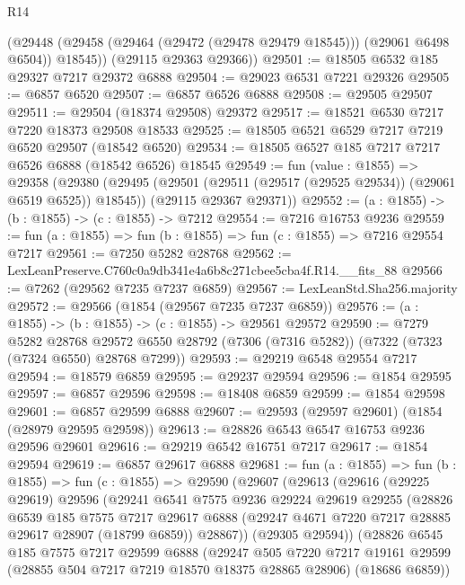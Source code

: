 \begin{lexlean}{R14}
\begin{coremodule}
        (@29448 (@29458 (@29464 (@29472 (@29478 @29479 @18545))) (@29061 @6498 @6504)) @18545))
      (@29115 @29363 @29366))
@29501 := @18505 @6532 @185 @29327 @7217 @29372 @6888
@29504 := @29023 @6531 @7221 @29326
@29505 := @6857 @6520
@29507 := @6857 @6526 @6888
@29508 := @29505 @29507
@29511 := @29504 (@18374 @29508) @29372
@29517 := @18521 @6530 @7217 @7220 @18373 @29508 @18533
@29525 := @18505 @6521 @6529 @7217 @7219 @6520 @29507 (@18542 @6520)
@29534 := @18505 @6527 @185 @7217 @7217 @6526 @6888 (@18542 @6526) @18545
@29549 := fun (value : @1855) =>
  @29358
    (@29380
      (@29495 (@29501 (@29511 (@29517 (@29525 @29534)) (@29061 @6519 @6525)) @18545))
      (@29115 @29367 @29371))
@29552 := (a : @1855) -> (b : @1855) -> (c : @1855) -> @7212
@29554 := @7216 @16753 @9236
@29559 := fun (a : @1855) => fun (b : @1855) => fun (c : @1855) => @7216 @29554 @7217
@29561 := @7250 @5282 @28768
@29562 := LexLeanPreserve.C760c0a9db341e4a6b8c271cbee5cba4f.R14.__fits_88
@29566 := @7262 (@29562 @7235 @7237 @6859)
@29567 := LexLeanStd.Sha256.majority
@29572 := @29566 (@1854 (@29567 @7235 @7237 @6859))
@29576 := (a : @1855) -> (b : @1855) -> (c : @1855) -> @29561 @29572
@29590 := @7279
    @5282
    @28768
    @29572
    @6550
    @28792
    (@7306 (@7316 @5282))
    (@7322 (@7323 (@7324 @6550) @28768 @7299))
@29593 := @29219 @6548 @29554 @7217
@29594 := @18579 @6859
@29595 := @29237 @29594
@29596 := @1854 @29595
@29597 := @6857 @29596
@29598 := @18408 @6859
@29599 := @1854 @29598
@29601 := @6857 @29599 @6888
@29607 := @29593 (@29597 @29601) (@1854 (@28979 @29595 @29598))
@29613 := @28826 @6543 @6547 @16753 @9236 @29596 @29601
@29616 := @29219 @6542 @16751 @7217
@29617 := @1854 @29594
@29619 := @6857 @29617 @6888
@29681 := fun (a : @1855) =>
  fun (b : @1855) =>
  fun (c : @1855) =>
  @29590
    (@29607
      (@29613
        (@29616
          (@29225 @29619)
          @29596
          (@29241
            @6541
            @7575
            @9236
            @29224
            @29619
            @29255
            (@28826
              @6539
              @185
              @7575
              @7217
              @29617
              @6888
              (@29247 @4671 @7220 @7217 @28885 @29617 @28907 (@18799 @6859))
              @28867))
          (@29305 @29594))
        (@28826
          @6545
          @185
          @7575
          @7217
          @29599
          @6888
          (@29247
            @505
            @7220
            @7217
            @19161
            @29599
            (@28855 @504 @7217 @7219 @18570 @18375 @28865 @28906)
            (@18686 @6859))

\end{coremodule}
\end{lexlean}
